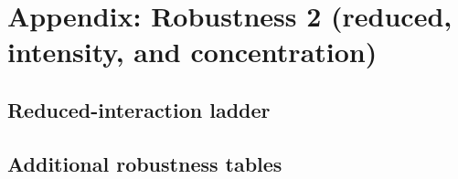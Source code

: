 \documentclass{article}
\newcommand{\cleanedresultsdir}{../../results/cleaned/tex}
\newcommand{\TableInput}[2][\linewidth]{}
\begin{document}
\begin{table}[H]
  \centering
  \caption{User productivity: core split (non-equity firms)}
  \TableInput{\cleanedresultsdir/llm_equity_no_cb_modes_user_core_split_non_equity.tex}
\end{table}

\begin{table}[H]
  \centering
  \caption{User productivity: core split (equity firms)}
  \TableInput{\cleanedresultsdir/llm_equity_no_cb_modes_user_core_split_equity.tex}
\end{table}

\appendix
\section*{Appendix: Robustness 2 (reduced, intensity, and concentration)}

\subsection*{Reduced-interaction ladder}
\begin{table}[H]
  \centering
  \caption{Firm growth: reduced-1 (Remote DD + equity heterogeneity; no startup interaction)}
  \TableInput{\cleanedresultsdir/llm_equity_no_cb_modes_firm_reduced1.tex}
\end{table}

\begin{table}[H]
  \centering
  \caption{Firm growth: reduced-2 (Remote $\times$ Post only DD)}
  \TableInput{\cleanedresultsdir/llm_equity_no_cb_modes_firm_simple_dd.tex}
\end{table}

\begin{table}[H]
  \centering
  \caption{User productivity: reduced-1 (Remote DD + equity heterogeneity; no startup interaction)}
  \TableInput{\cleanedresultsdir/llm_equity_no_cb_modes_user_reduced1.tex}
\end{table}

\begin{table}[H]
  \centering
  \caption{User productivity: reduced-2 (Remote $\times$ Post only DD)}
  \TableInput{\cleanedresultsdir/llm_equity_no_cb_modes_user_simple_dd.tex}
\end{table}

\subsection*{Additional robustness tables}
\begin{table}[H]
  \centering
  \caption{Firm growth: appendix robustness A}
  \TableInput{\cleanedresultsdir/llm_equity_no_cb_modes_firm_intensive_share.tex}
\end{table}
\end{document}
